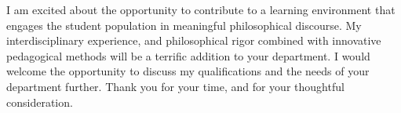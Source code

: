 \documentclass[
  letterpaper,
  DIV=11,
  numbers=noendperiod]{scrartcl}
\begin{document}
I am excited about the opportunity to contribute to a learning
environment that engages the student population in meaningful
philosophical discourse. My interdisciplinary experience, and
philosophical rigor combined with innovative pedagogical methods will be
a terrific addition to your department. I would welcome the opportunity
to discuss my qualifications and the needs of your department further.
Thank you for your time, and for your thoughtful consideration.
\end{document}
